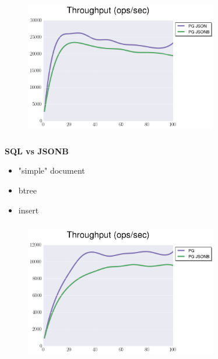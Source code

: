 \documentclass[usenames,dvipsnames, 18pt, compress, aspectratio=169]{beamer}
\begin{document}
\begin{frame}
    \frametitle{}
    \begin{center}
    \begin{figure}
        \includegraphics[width=0.75\textwidth,center]{benchmarks/postgresql_select_json_jsonb.png}
    \end{figure}
    \end{center}
\end{frame}

\begin{frame}
    \frametitle{}
    \begin{center}
        \textbf{SQL vs JSONB}
        \begin{itemize}[label={}]
            \item "simple" document
            \item btree
            \item insert
        \end{itemize}
    \end{center}
\end{frame}

\begin{frame}
    \frametitle{}
    \begin{center}
    \begin{figure}
        \includegraphics[width=0.75\textwidth,center]{benchmarks/postgresql_load_jsonb_jdbc.png}
    \end{figure}
    \end{center}
\end{frame}
\end{document}
